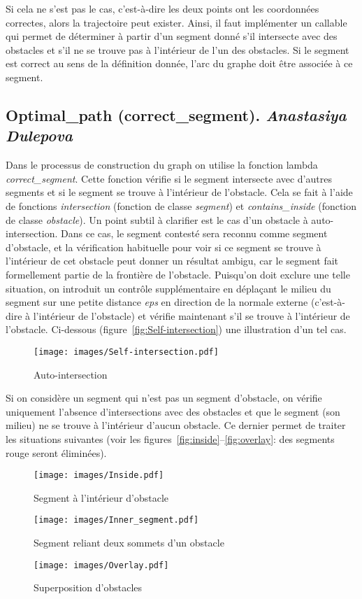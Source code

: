 \documentclass[12pt]{article}
\begin{document}
	Si cela ne s'est pas le cas, c'est-à-dire les deux points ont les coordonnées correctes, alors la trajectoire peut exister. Ainsi, il faut implémenter un callable qui permet de déterminer à partir d'un segment donné s'il intersecte avec des obstacles et s'il ne se trouve pas à l'intérieur de l'un des obstacles. Si le segment est correct au sens de la définition donnée, l'arc du graphe doit être associée à ce segment.
	
	\subsection{Optimal\_path (correct\_segment). \textit{Anastasiya Dulepova}}
	Dans le processus de construction du graph on utilise la fonction lambda \textit{correct\_segment}. Cette fonction vérifie si le segment intersecte avec d'autres segments et si le segment se trouve à l'intérieur de l'obstacle. Cela se fait à l'aide de fonctions \textit{intersection} (fonction de classe \textit{segment}) et \textit{contains\_inside} (fonction de classe \textit{obstacle}). Un point subtil à clarifier est le cas d'un obstacle à auto-intersection. Dans ce cas, le segment contesté sera reconnu comme segment d'obstacle, et la vérification habituelle pour voir si ce segment se trouve à l'intérieur de cet obstacle peut donner un résultat ambigu, car le segment fait formellement partie de la frontière de l'obstacle. Puisqu'on doit exclure une telle situation, on introduit un contrôle supplémentaire en déplaçant le milieu du segment sur une petite distance \textit{eps} en direction de la normale externe (c'est-à-dire à l'intérieur de l'obstacle) et vérifie maintenant s'il se trouve à l'intérieur de l'obstacle. Ci-dessous
    (figure~\eqref{fig:Self-intersection}) une illustration d'un tel cas. 
	\begin{figure}[H]
		\centering
		\texttt{[image: images/Self-intersection.pdf]}
		\caption{Auto-intersection}
		\label{fig:Self-intersection}
	\end{figure}
	
	Si on considère un segment qui n'est pas un segment d'obstacle, on vérifie uniquement l'absence d'intersections avec des obstacles et que le segment (son milieu) ne se trouve à l'intérieur d'aucun obstacle. Ce dernier permet de traiter les situations suivantes (voir les figures~\eqref{fig:inside}--\eqref{fig:overlay}: des segments rouge seront éliminées). 
	\begin{figure}[H]
		\centering
		\texttt{[image: images/Inside.pdf]}
		\caption{Segment à l'intérieur d'obstacle}
		\label{fig:inside}
	\end{figure}
	\begin{figure}[H]
		\centering
		\texttt{[image: images/Inner\_segment.pdf]}
		\caption{Segment reliant deux sommets d'un obstacle}
		\label{fig:corner-to-corner}
	\end{figure}
	\begin{figure}[H]
		\centering
		\texttt{[image: images/Overlay.pdf]}
		\caption{Superposition d'obstacles}
		\label{fig:overlay}
	\end{figure}
	
\end{document}
